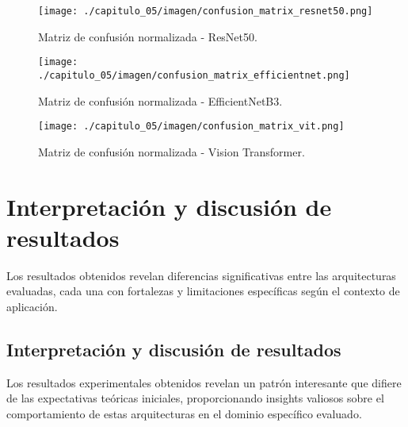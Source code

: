 \begin{table}[H]
\begin{figure}[H]
\leavevmode
\begin{minipage}{\textwidth}
\begin{center}
\texttt{[image: ./capitulo\_05/imagen/confusion\_matrix\_resnet50.png]}
\caption{Matriz de confusión normalizada - ResNet50.\label{fig:conf_matrix_resnet}}
\end{center}
\end{minipage}
\end{figure}

\begin{figure}[H]
\leavevmode
\begin{minipage}{\textwidth}
\begin{center}
\texttt{[image: ./capitulo\_05/imagen/confusion\_matrix\_efficientnet.png]}
\caption{Matriz de confusión normalizada - EfficientNetB3.\label{fig:conf_matrix_efficient}}
\end{center}
\end{minipage}
\end{figure}

\begin{figure}[H]
\leavevmode
\begin{minipage}{\textwidth}
\begin{center}
\texttt{[image: ./capitulo\_05/imagen/confusion\_matrix\_vit.png]}
\caption{Matriz de confusión normalizada - Vision Transformer.\label{fig:conf_matrix_vit}}
\end{center}
\end{minipage}
\end{figure}

\section{Interpretación y discusión de resultados}

Los resultados obtenidos revelan diferencias significativas entre las arquitecturas evaluadas, cada una con fortalezas y limitaciones específicas según el contexto de aplicación.

\subsection{Interpretación y discusión de resultados}

Los resultados experimentales obtenidos revelan un patrón interesante que difiere de las expectativas teóricas iniciales, proporcionando insights valiosos sobre el comportamiento de estas arquitecturas en el dominio específico evaluado.


\end{table}
